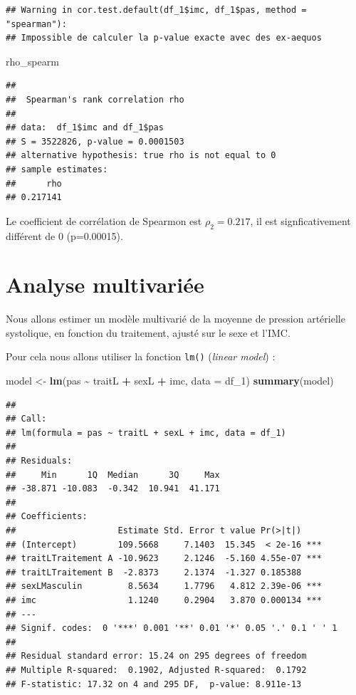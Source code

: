 \documentclass[
]{book}
\newenvironment{Shaded}{\begin{snugshade}}{\end{snugshade}}
\newcommand{\AttributeTok}[1]{\textcolor[rgb]{0.13,0.29,0.53}{#1}}
\newcommand{\FunctionTok}[1]{\textcolor[rgb]{0.13,0.29,0.53}{\textbf{#1}}}
\newcommand{\NormalTok}[1]{#1}
\newcommand{\OtherTok}[1]{\textcolor[rgb]{0.56,0.35,0.01}{#1}}
\newcommand{\SpecialCharTok}[1]{\textcolor[rgb]{0.81,0.36,0.00}{\textbf{#1}}}
\begin{document}
\begin{verbatim}
## Warning in cor.test.default(df_1$imc, df_1$pas, method = "spearman"):
## Impossible de calculer la p-value exacte avec des ex-aequos
\end{verbatim}

\begin{Shaded}
\begin{Highlighting}[]
\NormalTok{rho\_spearm}
\end{Highlighting}
\end{Shaded}

\begin{verbatim}
## 
##  Spearman's rank correlation rho
## 
## data:  df_1$imc and df_1$pas
## S = 3522826, p-value = 0.0001503
## alternative hypothesis: true rho is not equal to 0
## sample estimates:
##      rho 
## 0.217141
\end{verbatim}

Le coefficient de corrélation de Spearmon est \(\rho_2 = 0.217\), il est signficativement différent de 0 (p=0.00015).

\section{Analyse multivariée}\label{analyse-multivariuxe9e}

Nous allons estimer un modèle multivarié de la moyenne de pression artérielle systolique, en fonction du traitement, ajusté sur le sexe et l'IMC.

Pour cela nous allons utiliser la fonction \texttt{lm()} (\emph{linear model}) :

\begin{Shaded}
\begin{Highlighting}[]
\NormalTok{model }\OtherTok{\textless{}{-}} \FunctionTok{lm}\NormalTok{(pas }\SpecialCharTok{\textasciitilde{}}\NormalTok{ traitL }\SpecialCharTok{+}\NormalTok{ sexL }\SpecialCharTok{+}\NormalTok{ imc, }
            \AttributeTok{data =}\NormalTok{ df\_1)}
\FunctionTok{summary}\NormalTok{(model)}
\end{Highlighting}
\end{Shaded}

\begin{verbatim}
## 
## Call:
## lm(formula = pas ~ traitL + sexL + imc, data = df_1)
## 
## Residuals:
##     Min      1Q  Median      3Q     Max 
## -38.871 -10.083  -0.342  10.941  41.171 
## 
## Coefficients:
##                    Estimate Std. Error t value Pr(>|t|)    
## (Intercept)        109.5668     7.1403  15.345  < 2e-16 ***
## traitLTraitement A -10.9623     2.1246  -5.160 4.55e-07 ***
## traitLTraitement B  -2.8373     2.1374  -1.327 0.185388    
## sexLMasculin         8.5634     1.7796   4.812 2.39e-06 ***
## imc                  1.1240     0.2904   3.870 0.000134 ***
## ---
## Signif. codes:  0 '***' 0.001 '**' 0.01 '*' 0.05 '.' 0.1 ' ' 1
## 
## Residual standard error: 15.24 on 295 degrees of freedom
## Multiple R-squared:  0.1902, Adjusted R-squared:  0.1792 
## F-statistic: 17.32 on 4 and 295 DF,  p-value: 8.911e-13
\end{verbatim}
\end{document}
